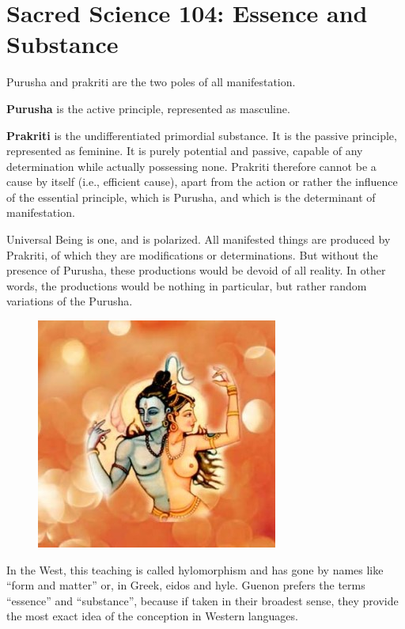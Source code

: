 \section{Sacred Science 104: Essence and Substance}

Purusha and prakriti are the two poles of all manifestation.

\textbf{Purusha} is the active principle, represented as masculine.

\textbf{Prakriti} is the undifferentiated primordial substance. It is the passive principle, represented as feminine. It is purely potential and passive, capable of any determination while actually possessing none. Prakriti therefore cannot be a cause by itself (i.e., efficient cause), apart from the action or rather the influence of the essential principle, which is Purusha, and which is the determinant of manifestation.

Universal Being is one, and is polarized. All manifested things are produced by Prakriti, of which they are modifications or determinations. But without the presence of Purusha, these productions would be devoid of all reality. In other words, the productions would be nothing in particular, but rather random variations of the Purusha.

\begin{figure}
\includegraphics[scale=.4]{a20221006SacredScience104EssenceandSubstance-img001.jpg} 
\end{figure}

In the West, this teaching is called hylomorphism and has gone by names like “form and matter” or, in Greek, eidos and hyle. Guenon prefers the terms “essence” and “substance”, because if taken in their broadest sense, they provide the most exact idea of the conception in Western languages.

